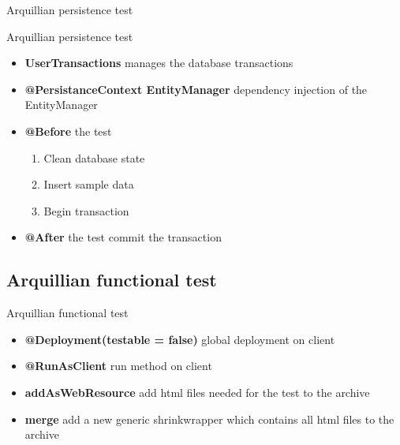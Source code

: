 \begin{frame}{Arquillian persistence test}
  
\end{frame}


\begin{frame}{Arquillian persistence test}
	\begin{itemize}
		\item {\textbf{UserTransactions}} manages the database transactions
		\item {\textbf{@PersistanceContext EntityManager}} dependency injection of the EntityManager
		\item {\textbf{@Before}} the test 
			\begin{enumerate}
				\item Clean database state
				\item Insert sample data
				\item Begin transaction
			\end{enumerate}
		\item {\textbf{@After}} the test commit the transaction
	\end{itemize}
\end{frame}

\subsection[Functional test]{Arquillian functional test}
\begin{frame}{Arquillian functional test}
  
  \begin{itemize}
  	\item {\textbf{@Deployment(testable = false)}} global deployment on client
  	\item {\textbf{@RunAsClient}} run method on client
  	\item {\textbf{addAsWebResource}} add html files needed for the test to the archive
  	\item {\textbf{merge}} add a new generic shrinkwrapper which contains all html files to the archive
  \end{itemize}
  
\end{frame}

